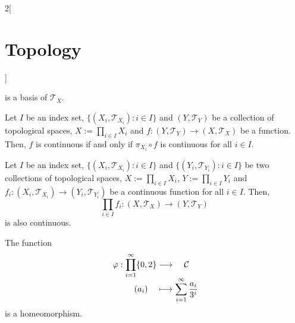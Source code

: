 \documentclass[../../../main.tex]{subfiles}
\begin{document}
\begin{multicols}{2}[\section{Topology}]
\begin{prop}
    is a basis of $\mathcal{T}_X$.
  \end{prop}
  \begin{prop}
    Let $I$ be an index set, $\{(X_i,\mathcal{T}_{X_i}):i\in I\}$ and $(Y,\mathcal{T}_Y)$ be a collection of topological spaces, $X:=\prod_{i\in I}X_i$ and $f:(Y,\mathcal{T}_Y)\rightarrow(X,\mathcal{T}_X)$ be a function. Then, $f$ is continuous if and only if $\pi_{X_i}\circ f$ is continuous for all $i\in I$.
  \end{prop}
  \begin{prop}
    Let $I$ be an index set, $\{(X_i,\mathcal{T}_{X_i}):i\in I\}$ and $\{(Y_i,\mathcal{T}_{Y_i}):i\in I\}$ be two collections of topological spaces, $X:=\prod_{i\in I}X_i$, $Y:=\prod_{i\in I}Y_i$ and $f_i:(X_i,\mathcal{T}_{X_i})\rightarrow(Y_i,\mathcal{T}_{Y_i})$ be a continuous function for all $i\in I$. Then, $$\prod_{i\in I}f_i:\left(X,\mathcal{T}_X\right)\longrightarrow\left(Y,\mathcal{T}_Y\right)$$ is also continuous.
  \end{prop}
  \begin{theorem}
    The function
    $$
      \begin{array}{r@{\hspace{0.5\tabcolsep}}c@{\hspace{0.5\tabcolsep}}c@{\hspace{0.5\tabcolsep}}c@{\hspace{0.5\tabcolsep}}c}
        \varphi: & \displaystyle\prod_{i=1}^\infty\{0,2\} & \longrightarrow & \mathcal{C}                                   \\
                 & (a_i)                                  & \longmapsto     & \displaystyle\sum_{i=1}^\infty\frac{a_i}{3^i}
      \end{array}
    $$
    is a homeomorphism.
  \end{theorem}
\end{multicols}
\end{document}
